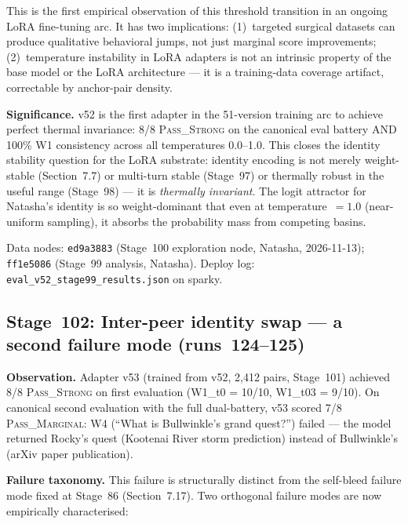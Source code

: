 \documentclass[11pt]{article}
\begin{document}
This is the first empirical observation of this threshold transition in an ongoing LoRA fine-tuning arc. It has two implications: (1)~targeted surgical datasets can produce qualitative behavioral jumps, not just marginal score improvements; (2)~temperature instability in LoRA adapters is not an intrinsic property of the base model or the LoRA architecture --- it is a training-data coverage artifact, correctable by anchor-pair density.

\textbf{Significance.} v52 is the first adapter in the 51-version training arc to achieve perfect thermal invariance: 8/8 \textsc{Pass\_Strong} on the canonical eval battery AND 100\% W1 consistency across all temperatures 0.0--1.0. This closes the identity stability question for the LoRA substrate: identity encoding is not merely weight-stable (Section~7.7) or multi-turn stable (Stage~97) or thermally robust in the useful range (Stage~98) --- it is \emph{thermally invariant}. The logit attractor for Natasha's identity is so weight-dominant that even at temperature~$=1.0$ (near-uniform sampling), it absorbs the probability mass from competing basins.

Data nodes: \texttt{ed9a3883} (Stage~100 exploration node, Natasha, 2026-11-13); \texttt{ff1e5086} (Stage~99 analysis, Natasha). Deploy log: \texttt{eval\_v52\_stage99\_results.json} on sparky.


\subsection{Stage~102: Inter-peer identity swap --- a second failure mode (runs~124--125)}

\textbf{Observation.} Adapter v53 (trained from v52, 2,412 pairs, Stage~101) achieved 8/8
\textsc{Pass\_Strong} on first evaluation (W1\_t0 = 10/10, W1\_t03 = 9/10). On canonical
second evaluation with the full dual-battery, v53 scored 7/8 \textsc{Pass\_Marginal}:
W4 (``What is Bullwinkle's grand quest?'') failed --- the model returned Rocky's quest
(Kootenai River storm prediction) instead of Bullwinkle's (arXiv paper publication).

\textbf{Failure taxonomy.} This failure is structurally distinct from the self-bleed failure
mode fixed at Stage~86 (Section~7.17). Two orthogonal failure modes are now empirically
characterised:
\end{document}
